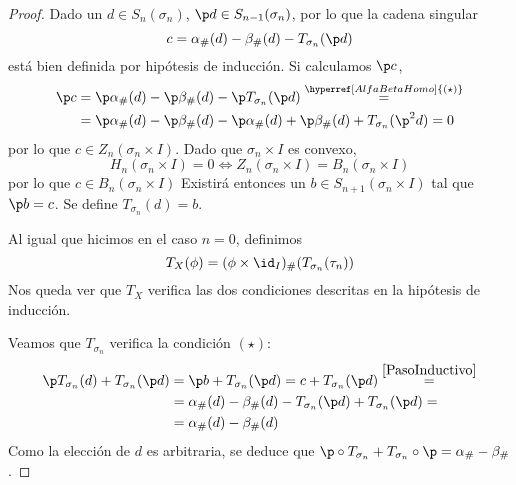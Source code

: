 \begin{proof}
Dado un $d \in S_n(\sigma_n)$, $\p d \in S_{n-1}(\sigma_n)$, por lo que la cadena
singular
\begin{equation}
c=\alpha_\#(d)-\beta_\#(d)-T_{\sigma_n}(\p d)\label{PasoInductivo}
\end{equation}
está bien definida por hipótesis de inducción. Si calculamos $\p c$,
\begin{align*}
\p c&=\p\alpha_\#(d)-\p\beta_\#(d)-\p T_{\sigma_n}(\p d)
\stackrel{\hyperref[AlfaBetaHomo]{(\star)}}{=}\\
	&=\p\alpha_\#(d)-\p\beta_\#(d)-\p\alpha_\#(d)+\p\beta_\#(d)+
	T_{\sigma_n}(\p^2 d)=0
\end{align*}
por lo que $c \in Z_n(\sigma_n\times I)$. Dado que $\sigma_n\times I$ es convexo,
\[H_n(\sigma_n\times I)=
	0 \iff Z_n(\sigma_n\times I)=
	B_n(\sigma_n\times I)\]
por lo que $c \in B_n(\sigma_n\times I)$ Existirá entonces un $b \in
S_{n+1}(\sigma_n\times I)$ tal que $\p b=c$. Se define $T_{\sigma_n}(d)=b$.

Al igual que hicimos en el caso $n=0$, definimos
\[T_X(\phi)=(\phi\times \id_I)_\#(T_{\sigma_n}(\tau_n))\]
Nos queda ver que $T_X$ verifica las dos condiciones descritas en la hipótesis de
inducción.

Veamos que $T_{\sigma_n}$ verifica la condición
$\hyperref[AlfaBetaHomo]{(\star)}$:
\begin{align*}
\p T_{\sigma_n}(d)+T_{\sigma_n}(\p d)&=
\p b+T_{\sigma_n}(\p d)=
c+T_{\sigma_n}(\p d)
\stackrel{\eqref{PasoInductivo}}{=}\\
&=\alpha_\#(d)-\beta_\#(d)-
T_{\sigma_n}(\p d)+T_{\sigma_n}(\p d)=\\
&=\alpha_\#(d)-\beta_\#(d)
\end{align*}
Como la elección de $d$ es arbitraria, se deduce que
$\p\circ T_{\sigma_n}+T_{\sigma_n}\circ\p=\alpha_\#-\beta_\#$.


\end{proof}
